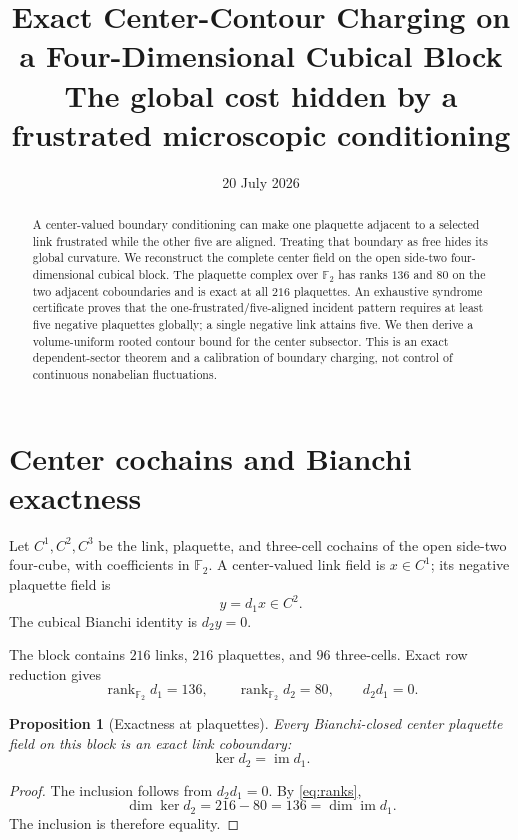 \documentclass[11pt]{article}
\title{Exact Center-Contour Charging on a Four-Dimensional Cubical Block\\
\large The global cost hidden by a frustrated microscopic conditioning}
\author{}
\date{20 July 2026}
\newtheorem{proposition}[theorem]{Proposition}
\newcommand{\F}{\mathbb F_2}
\begin{document}
\maketitle

\begin{abstract}
A center-valued boundary conditioning can make one plaquette adjacent to a
selected link frustrated while the other five are aligned.  Treating that
boundary as free hides its global curvature.  We reconstruct the complete
center field on the open side-two four-dimensional cubical block.  The
plaquette complex over $\F$ has ranks $136$ and $80$ on the two adjacent
coboundaries and is exact at all $216$ plaquettes.  An exhaustive syndrome
certificate proves that the one-frustrated/five-aligned incident pattern
requires at least five negative plaquettes globally; a single negative link
attains five.  We then derive a volume-uniform rooted contour bound for the
center subsector.  This is an exact dependent-sector theorem and a calibration
of boundary charging, not control of continuous nonabelian fluctuations.
\end{abstract}

\tableofcontents

\section{Center cochains and Bianchi exactness}

Let $C^1,C^2,C^3$ be the link, plaquette, and three-cell cochains of the open
side-two four-cube, with coefficients in $\F$.  A center-valued link field is
$x\in C^1$; its negative plaquette field is
\[
 y=d_1x\in C^2.
\]
The cubical Bianchi identity is $d_2y=0$.

The block contains $216$ links, $216$ plaquettes, and $96$ three-cells.  Exact
row reduction gives
\begin{equation}
 \operatorname{rank}_{\F}d_1=136,
 \qquad
 \operatorname{rank}_{\F}d_2=80,
 \qquad d_2d_1=0.
 \label{eq:ranks}
\end{equation}

\begin{proposition}[Exactness at plaquettes]
Every Bianchi-closed center plaquette field on this block is an exact link
coboundary:
\[
 \ker d_2=\operatorname{im}d_1.
\]
\end{proposition}
\begin{proof}
The inclusion follows from $d_2d_1=0$.  By \eqref{eq:ranks},
\[
 \dim\ker d_2=216-80=136=\dim\operatorname{im}d_1.
\]
The inclusion is therefore equality.
\end{proof}
\end{document}
